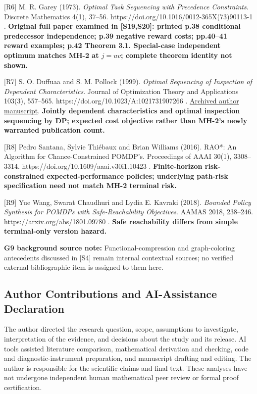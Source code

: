 \documentclass[
  10pt,
  american,
  a4paper,
]{article}
\begin{document}
{[}R6{]} M. R. Garey (1973). \emph{Optimal Task Sequencing with
Precedence Constraints}. Discrete Mathematics 4(1), 37--56.
https://doi.org/10.1016/0012-365X(73)90113-1 . \textbf{Original full
paper examined in {[}S19,S20{]}: printed p.38 conditional predecessor
independence; p.39 negative reward costs; pp.40--41 reward examples;
p.42 Theorem 3.1. Special-case independent optimum matches MH-2 at
\(j=uv\); complete theorem identity not shown.}

{[}R7{]} S. O. Duffuaa and S. M. Pollock (1999). \emph{Optimal
Sequencing of Inspection of Dependent Characteristics}. Journal of
Optimization Theory and Applications 103(3), 557--565.
https://doi.org/10.1023/A:1021731907266 .
\href{https://deepblue.lib.umich.edu/bitstream/handle/2027.42/45190/10957_2004_Article_411720.pdf?sequence=1}{Archived
author manuscript}. \textbf{Jointly dependent characteristics and
optimal inspection sequencing by DP; expected cost objective rather than
MH-2's newly warranted publication count.}

{[}R8{]} Pedro Santana, Sylvie Thiébaux and Brian Williams (2016). RAO*:
An Algorithm for Chance-Constrained POMDP's. Proceedings of AAAI 30(1),
3308--3314. https://doi.org/10.1609/aaai.v30i1.10423 .
\textbf{Finite-horizon risk-constrained expected-performance policies;
underlying path-risk specification need not match MH-2 terminal risk.}

{[}R9{]} Yue Wang, Swarat Chaudhuri and Lydia E. Kavraki (2018).
\emph{Bounded Policy Synthesis for POMDPs with Safe-Reachability
Objectives}. AAMAS 2018, 238--246. https://arxiv.org/abs/1801.09780 .
\textbf{Safe reachability differs from simple terminal-only version
hazard.}

\textbf{G9 background source note:} Functional-compression and
graph-coloring antecedents discussed in {[}S4{]} remain internal
contextual sources; no verified external bibliographic item is assigned
to them here.

\hypertarget{author-contributions-and-ai-assistance-declaration}{%
\subsection{Author Contributions and AI-Assistance
Declaration}\label{author-contributions-and-ai-assistance-declaration}}

The author directed the research question, scope, assumptions to
investigate, interpretation of the evidence, and decisions about the
study and its release. AI tools assisted literature comparison,
mathematical derivation and checking, code and diagnostic-instrument
preparation, and manuscript drafting and editing. The author is
responsible for the scientific claims and final text. These analyses
have not undergone independent human mathematical peer review or formal
proof certification.
\end{document}
